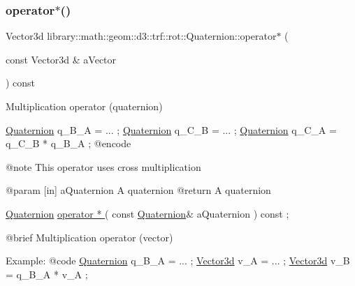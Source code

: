 \subsubsection{\texorpdfstring{operator$\ast$()}{operator*()}}
{\footnotesize\ttfamily Vector3d library\+::math\+::geom\+::d3\+::trf\+::rot\+::\+Quaternion\+::operator$\ast$ (\begin{DoxyParamCaption}\item[{const Vector3d \&}]{a\+Vector }\end{DoxyParamCaption}) const}



Multiplication operator (quaternion) 


\begin{DoxyCode}
                        \hyperlink{classlibrary_1_1math_1_1geom_1_1d3_1_1trf_1_1rot_1_1_quaternion_a1b8794cce68c5ee86dd50f9ba53635fa}{Quaternion} q\_B\_A = ... ;
                        \hyperlink{classlibrary_1_1math_1_1geom_1_1d3_1_1trf_1_1rot_1_1_quaternion_a1b8794cce68c5ee86dd50f9ba53635fa}{Quaternion} q\_C\_B = ... ;
                        \hyperlink{classlibrary_1_1math_1_1geom_1_1d3_1_1trf_1_1rot_1_1_quaternion_a1b8794cce68c5ee86dd50f9ba53635fa}{Quaternion} q\_C\_A = q\_C\_B * q\_B\_A ;
    @encode
   
    @note               This \textcolor{keyword}{operator} uses cross multiplication
   
    @param              [in] aQuaternion A quaternion
    @\textcolor{keywordflow}{return}             A quaternion

\hyperlink{classlibrary_1_1math_1_1geom_1_1d3_1_1trf_1_1rot_1_1_quaternion_a1b8794cce68c5ee86dd50f9ba53635fa}{Quaternion}              \hyperlink{classlibrary_1_1math_1_1geom_1_1d3_1_1trf_1_1rot_1_1_quaternion_a7f09ef0c53cb1f2d68a5c0aa8fb9de56}{operator *                                  }
      (   \textcolor{keyword}{const}   \hyperlink{classlibrary_1_1math_1_1geom_1_1d3_1_1trf_1_1rot_1_1_quaternion_a1b8794cce68c5ee86dd50f9ba53635fa}{Quaternion}&                 aQuaternion                                 ) \textcolor{keyword}{const} ;

    @brief              Multiplication operator (vector)
   
    Example:
    @code                 
                        \hyperlink{classlibrary_1_1math_1_1geom_1_1d3_1_1trf_1_1rot_1_1_quaternion_a1b8794cce68c5ee86dd50f9ba53635fa}{Quaternion} q\_B\_A = ... ;
                        \hyperlink{namespacelibrary_1_1math_1_1obj_a977e84e9bf317a4e7dd9d6d671d6da2f}{Vector3d} v\_A = ... ;
                        \hyperlink{namespacelibrary_1_1math_1_1obj_a977e84e9bf317a4e7dd9d6d671d6da2f}{Vector3d} v\_B = q\_B\_A * v\_A ;
\end{DoxyCode}


